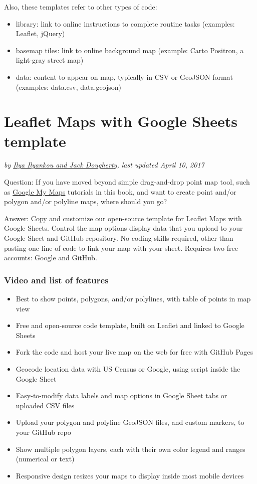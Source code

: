 \documentclass[
  english,
]{book}
\providecommand{\tightlist}{%
  \setlength{\itemsep}{0pt}\setlength{\parskip}{0pt}}
\begin{document}
Also, these templates refer to other types of code:

\begin{itemize}
\tightlist
\item
  library: link to online instructions to complete routine tasks (examples: Leaflet, jQuery)
\item
  basemap tiles: link to online background map (example: Carto Positron, a light-gray street map)
\item
  data: content to appear on map, typically in CSV or GeoJSON format (examples: data.csv, data.geojson)
\end{itemize}

\hypertarget{leaflet-maps-with-google-sheets}{%
\section{Leaflet Maps with Google Sheets template}\label{leaflet-maps-with-google-sheets}}

\emph{by \href{authors}{Ilya Ilyankou and Jack Dougherty}, last updated April 10, 2017}

Question: If you have moved beyond simple drag-and-drop point map tool, such as \href{mymaps}{Google My Maps} tutorials in this book, and want to create point and/or polygon and/or polyline maps, where should you go?

Answer: Copy and customize our open-source template for Leaflet Maps with Google Sheets. Control the map options display data that you upload to your Google Sheet and GitHub repository. No coding skills required, other than pasting one line of code to link your map with your sheet. Requires two free accounts: Google and GitHub.

\hypertarget{video-and-list-of-features}{%
\subsubsection*{Video and list of features}\label{video-and-list-of-features}}

\begin{itemize}
\tightlist
\item
  Best to show points, polygons, and/or polylines, with table of points in map view
\item
  Free and open-source code template, built on Leaflet and linked to Google Sheets
\item
  Fork the code and host your live map on the web for free with GitHub Pages
\item
  Geocode location data with US Census or Google, using script inside the Google Sheet
\item
  Easy-to-modify data labels and map options in Google Sheet tabs or uploaded CSV files
\item
  Upload your polygon and polyline GeoJSON files, and custom markers, to your GitHub repo
\item
  Show multiple polygon layers, each with their own color legend and ranges (numerical or text)
\item
  Responsive design resizes your maps to display inside most mobile devices
\end{itemize}
\end{document}
